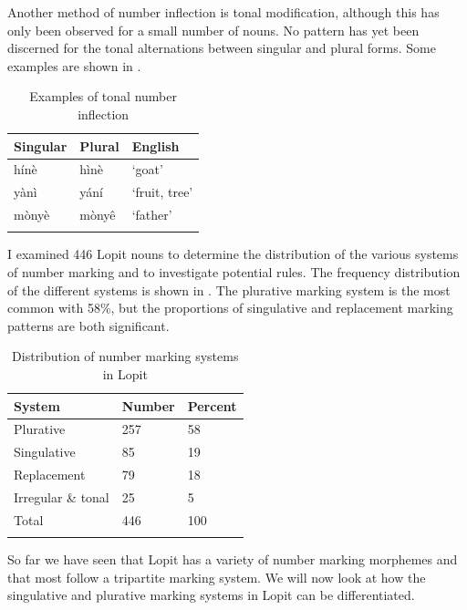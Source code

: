 \documentclass[output=paper]{langsci/langscibook}
\begin{document}
Another method of number inflection is tonal modification, although this has only been observed for a small number of nouns. No pattern has yet been discerned for the tonal alternations between singular and plural forms. Some examples are shown in .

\begin{table}
\begin{tabularx}{\textwidth}{XXX}
\lsptoprule

\mdseries \textbf{Singular} & \mdseries \textbf{Plural} & \mdseries \textbf{English}\\
\midrule
 h\'{i}n\`{e} &  h\`{i}n\`{e} & \mdseries ‘goat’\\
 y\`{a}n\`{i} &  y\'{a}n\'{i} & \mdseries ‘fruit, tree’\\
 m\`{o}ny\`{e} &  m\`{o}ny\^{e} & \mdseries ‘father’\\
\lspbottomrule
\end{tabularx}
\caption{Examples of tonal number inflection}
\label{tab:moodie:4}
\end{table}

I examined 446 Lopit nouns to determine the distribution of the various systems of number marking and to investigate potential rules. The frequency distribution of the different systems is shown in . The plurative marking system is the most common with 58\%, but the proportions of singulative and replacement marking patterns are both significant. 

\begin{table}
\begin{tabularx}{\textwidth}{XXX}
\lsptoprule

\mdseries \textbf{System } & \mdseries \textbf{Number} & \mdseries \textbf{Percent}\\ \midrule
Plurative & 257 & 58\\
Singulative & 85 & 19\\
Replacement & 79 & 18\\
Irregular \& tonal & 25 & 5\\
Total & 446 & 100\\
\lspbottomrule
\end{tabularx}
\caption{Distribution of number marking systems in Lopit}
\label{tab:moodie:5}
\end{table}

So far we have seen that Lopit has a variety of number marking morphemes and that most follow a tripartite marking system. We will now look at how the singulative and plurative marking systems in Lopit can be differentiated.
\end{document}
